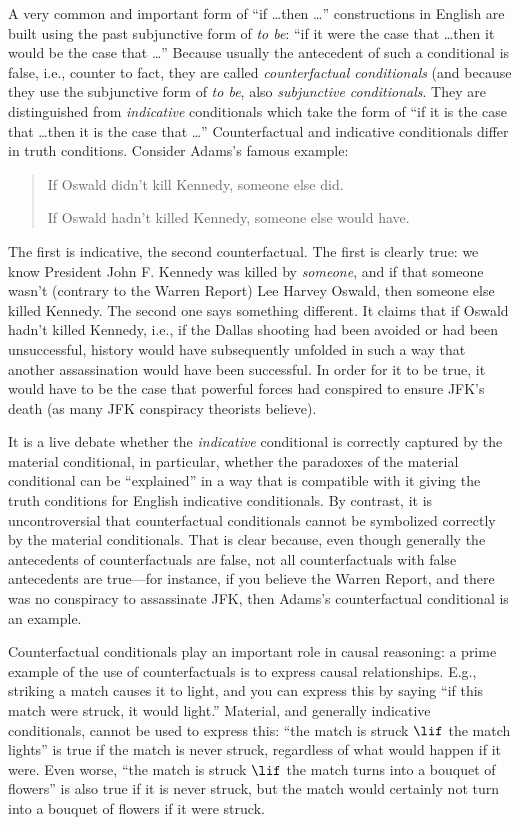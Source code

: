\documentclass[../../../include/open-logic-section]{subfiles}
\begin{document}

A very common and important form of ``if \dots then \dots''
constructions in English are built using the past subjunctive form of
\emph{to be}: ``if it were the case that \dots then it would be the
case that \dots'' Because usually the antecedent of such a conditional
is false, i.e., counter to fact, they are called \emph{counterfactual
  conditionals} (and because they use the subjunctive form of \emph{to
  be}, also \emph{subjunctive conditionals}. They are distinguished
from \emph{indicative} conditionals which take the form of ``if it is
the case that \dots then it is the case that \dots'' Counterfactual and
indicative conditionals differ in truth conditions. Consider Adams's
famous example:
\begin{quote}
  If Oswald didn't kill Kennedy, someone else did.
  
  If Oswald hadn't killed Kennedy, someone else would have.
\end{quote}
The first is indicative, the second counterfactual. The first is
clearly true: we know President John F. Kennedy was killed by \emph{someone}, and if that someone
wasn't (contrary to the Warren Report) Lee Harvey Oswald, then someone
else killed Kennedy. The second one says something different. It claims
that if Oswald hadn't killed Kennedy, i.e., if the Dallas shooting had
been avoided or had been unsuccessful, history would have subsequently
unfolded in such a way that another assassination would have been
successful. In order for it to be true, it would have to be the case
that powerful forces had conspired to ensure JFK's death (as many JFK
conspiracy theorists believe).

It is a live debate whether the \emph{indicative} conditional is
correctly captured by the material conditional, in particular, whether
the paradoxes of the material conditional can be ``explained'' in a
way that is compatible with it giving the truth conditions for English
indicative conditionals. By contrast, it is uncontroversial that
counterfactual conditionals cannot be symbolized correctly by the
material conditionals. That is clear because, even though generally
the antecedents of counterfactuals are false, not all counterfactuals
with false antecedents are true---for instance, if you believe the
Warren Report, and there was no conspiracy to assassinate JFK, then
Adams's counterfactual conditional is an example.

Counterfactual conditionals play an important role in causal
reasoning: a prime example of the use of counterfactuals is to express
causal relationships. E.g., striking a match causes it to light, and
you can express this by saying ``if this match were struck, it would
light.''  Material, and generally indicative conditionals, cannot be
used to express this: ``the match is struck $\lif$ the match lights''
is true if the match is never struck, regardless of what would happen
if it were. Even worse, ``the match is struck $\lif$ the match turns
into a bouquet of flowers'' is also true if it is never struck, but
the match would certainly not turn into a bouquet of flowers if it
were struck.
\end{document}
